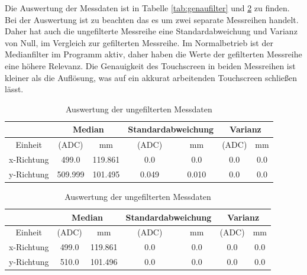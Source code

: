 Die Auswertung der Messdaten ist in Tabelle \cref{tab:genaufilter} und \cref{tab:genauunfilter} zu finden.
Bei der Auswertung ist zu beachten das es um zwei separate Messreihen handelt.
Daher hat auch die ungefilterte Messreihe eine Standardabweichung und Varianz von Null, im Vergleich zur gefilterten Messreihe.
Im Normalbetrieb ist der Medianfilter im Programm aktiv, daher haben die Werte der gefilterten Messreihe eine höhere Relevanz.
Die Genauigkeit des Touchscreen in beiden Messreihen ist kleiner als die Auflösung, was auf ein akkurat arbeitenden Touchscreen schließen lässt.
\begin{table}[ht!]
    \caption{Auswertung der gefilterten Messdaten }
    \begin{center}
        \begin{tabular}{ |c|c|c|c|c|c|c| }
          \hline&\multicolumn{2}{c|}{Median}& \multicolumn{2}{c|}{Standardabweichung}&\multicolumn{2}{c|}{Varianz} \\ \hline
         Einheit    &(ADC)              &mm             &(ADC)          &mm             &(ADC)      &mm\\\hline
         x-Richtung & \SI{499,0}{}      & \SI{119,861}{}&\SI{0,0}{}     &\SI{0,0}{}     &\SI{0,0}{} & \SI{0,0}{} \\  \hline
         y-Richtung & \SI{509,999}{}    & \SI{101,495}{}&\SI{0,049}{}   &\SI{0,010}{}   &\SI{0,0}{} & \SI{0,0}{} \\ \hline  
        \end{tabular}
        \label{tab:genaufilter}
    \end{center}   
    \caption{Auswertung der ungefilterten Messdaten}
    \begin{center}
        \begin{tabular}{ |c|c|c|c|c|c|c| }
          \hline&\multicolumn{2}{c|}{Median}& \multicolumn{2}{c|}{Standardabweichung}&\multicolumn{2}{c|}{Varianz} \\ \hline
          Einheit &(ADC)&mm&(ADC)&mm&(ADC)&mm\\\hline
          x-Richtung & \SI{499,0}{} & \SI{119,861}{}&\SI{0,0}{}&\SI{0,0}{}&\SI{0,0}{} & \SI{0,0}{} \\  \hline
          y-Richtung & \SI{510,0}{} & \SI{101,496}{}&\SI{0,0}{}&\SI{0,0}{}&\SI{0,0}{} & \SI{0,0}{} \\ \hline  
        \end{tabular}
        \label{tab:genauunfilter}
    \end{center}   
\end{table}


